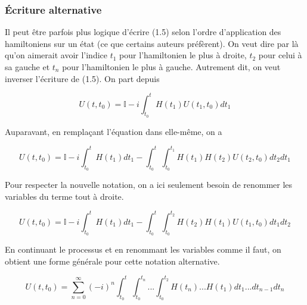 \subsubsection{Écriture alternative}
Il peut être parfois plus logique d'écrire (1.5) selon l'ordre d'application des hamiltoniens sur un état (ce que certains auteurs préfèrent). On veut dire par là qu'on aimerait avoir l'indice $t_1$ pour l'hamiltonien le plus à droite, $t_2$ pour celui à sa gauche et $t_n$ pour l'hamiltonien le plus à gauche. Autrement dit, on veut inverser l'écriture de (1.5). On part depuis 

\begin{equation*}
    U(t,t_0) = \mathbb{I} -i\int_{t_0}^{t}H(t_1)U(t_1,t_0)dt_1
\end{equation*}

Auparavant, en remplaçant l'équation dans elle-même, on a 

\begin{equation*}
    U(t,t_0) = \mathbb{I} -i\int_{t_0}^{t}H(t_1)dt_1 - \int_{t_0}^{t}\int_{t_0}^{t_1}H(t_1)H(t_2)U(t_2,t_0)dt_2dt_1
\end{equation*}

Pour respecter la nouvelle notation, on a ici seulement besoin de renommer les variables du terme tout à droite.

\begin{equation*}
    U(t,t_0) = \mathbb{I} -i\int_{t_0}^{t}H(t_1)dt_1 - \int_{t_0}^{t}\int_{t_0}^{t_2}H(t_2)H(t_1)U(t_1,t_0)dt_1dt_2
\end{equation*}

En continuant le processus et en renommant les variables comme il faut, on obtient une forme générale pour cette notation alternative.

\begin{equation}
    U(t,t_0) = \sum_{n=0}^{\infty} (-i)^n \int_{t_0}^{t}\int_{t_0}^{t_n}...\int_{t_0}^{t_2}H(t_n)...H(t_1)dt_1 ... dt_{n-1} dt_n
\end{equation}




